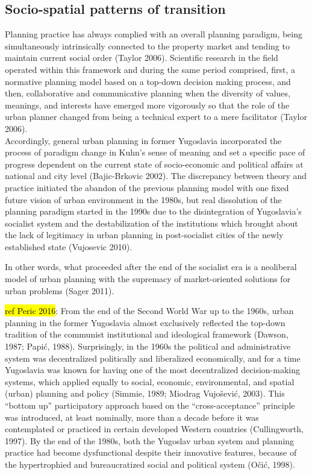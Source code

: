 \documentclass[11pt]{report}
\begin{document}
\subsection{Socio-spatial patterns of transition}
Planning practice has always complied with an overall planning paradigm, being simultaneously intrinsically connected to the property market and tending to maintain current social order (Taylor 2006). Scientific research in the field operated within this framework and during the same period comprised, first, a normative planning model based on a top-down decision making process, and then, collaborative and communicative planning when the diversity of values, meanings, and interests have emerged more vigorously so that the role of the urban planner changed from being a technical expert to a mere facilitator (Taylor 2006).
\\
Accordingly, general urban planning in former Yugoslavia incorporated the process of paradigm change in Kuhn’s sense of meaning and set a specific pace of progress dependent on the current state of socio-economic and political affairs at national and city level (Bajic-Brkovic 2002). The discrepancy between theory and practice initiated the abandon of the previous planning model with one fixed future vision of urban environment in the 1980s, but real dissolution of the planning paradigm started in the 1990s due to the disintegration of Yugoslavia’s socialist system and the destabilization of the institutions which brought about the lack of legitimacy in urban planning in post-socialist cities of the newly established state (Vujosevic 2010).

In other words, what proceeded after the end of the socialist era is a neoliberal model of urban planning with the supremacy of market-oriented solutions for urban problems (Sager 2011).

\hl{ref Peric 2016}: 
From the end of the Second World War up to the 1960s, urban planning in the former Yugoslavia almost exclusively reflected the top-down tradition of the communist institutional and ideological framework (Dawson, 1987; Papić, 1988). Surprisingly, in the 1960s the political and administrative system was decentralized politically and liberalized economically, and for a time Yugoslavia was known for having one of the most decentralized decision-making systems, which applied equally to social, economic, environmental, and spatial (urban) planning and policy (Simmie, 1989; Miodrag Vujošević, 2003). This “bottom up” participatory approach based on the “cross-acceptance” principle was introduced, at least nominally, more than a decade before it was contemplated or practiced in certain developed Western countries (Cullingworth, 1997). By the end of the 1980s, both the Yugoslav urban system and planning practice had become dysfunctional despite their innovative features, because of the hypertrophied and bureaucratized social and political system (Očić, 1998).
\end{document}
